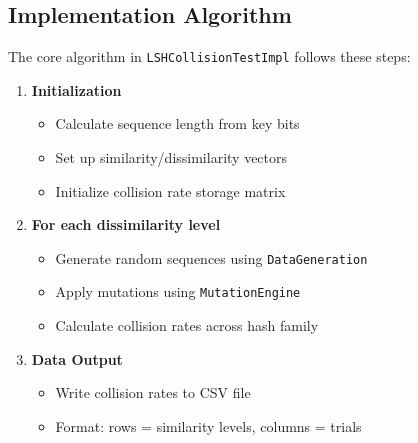 \documentclass[11pt,a4paper]{article}
\begin{document}
\subsection{Implementation Algorithm}

The core algorithm in \texttt{LSHCollisionTestImpl} follows these steps:

\begin{enumerate}
    \item \textbf{Initialization}
    \begin{itemize}
        \item Calculate sequence length from key bits
        \item Set up similarity/dissimilarity vectors
        \item Initialize collision rate storage matrix
    \end{itemize}
    
    \item \textbf{For each dissimilarity level}
    \begin{itemize}
        \item Generate random sequences using \texttt{DataGeneration}
        \item Apply mutations using \texttt{MutationEngine}
        \item Calculate collision rates across hash family
    \end{itemize}
    
    \item \textbf{Data Output}
    \begin{itemize}
        \item Write collision rates to CSV file
        \item Format: rows = similarity levels, columns = trials
    \end{itemize}
\end{enumerate}
\end{document}
